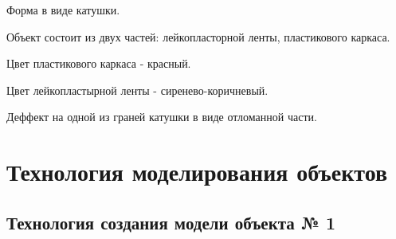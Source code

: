 \documentclass[12pt]{article}
\begin{document}
Форма в виде катушки.

Объект состоит из двух частей: лейкопласторной ленты, пластикового каркаса. 

Цвет пластикового каркаса - красный.

Цвет лейкопластырной ленты - сиренево-коричневый.

Деффект на одной из граней катушки в виде отломанной части.




\section{Технология моделирования объектов}
\subsection{Технология создания модели объекта № 1}
\end{document}

